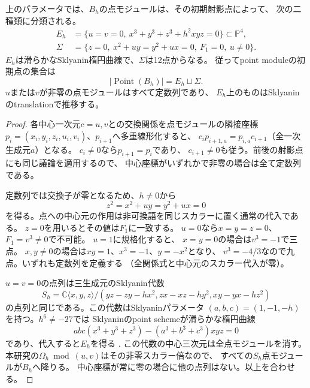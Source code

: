 \begin{proposition}\label{prop:psp-point-support}
上のパラメータでは、$B_h$の点モジュールは、その初期射影点によって、
次の二種類に分類される。
\[
\begin{split}
E_h&=\{u=v=0,\ x^3+y^3+z^3+h^2xyz=0\}
             \subset\mathbb P^4,\\
\Sigma&=\{z=0,\ x^2+uy=y^2+ux=0,\ F_1=0,\ u\ne0\}.
\end{split}
\]
$E_h$は滑らかなSklyanin楕円曲線で、$\Sigma$は12点からなる。
従ってpoint moduleの初期点の集合は
\[
|\operatorname{Point}(B_h)|=E_h\sqcup\Sigma.
\tag{PSP1}\label{eq:psp-support}
\]
$u$または$v$が非零の点モジュールはすべて定数列であり、
$E_h$上のものはSklyaninのtranslationで推移する。
\end{proposition}
\begin{proof}
各中心一次元$c=u,v$との交換関係を点モジュールの隣接座標
$p_i=(x_i,y_i,z_i,u_i,v_i)$、$p_{i+1}$へ多重線形化すると、
$c_ip_{i+1,a}=p_{i,a}c_{i+1}$（全一次生成元$a$）となる。
$c_i\ne0$なら$p_{i+1}=p_i$であり、
$c_{i+1}\ne0$も従う。前後の射影点にも同じ議論を適用するので、
中心座標がいずれかで非零の場合は全て定数列である。

定数列では交換子が零となるため、$h\ne0$から
\[
z^2=x^2+uy=y^2+ux=0
\]
を得る。点への中心元の作用は非可換語を同じスカラーに置く通常の代入である。
$z=0$を用いるとその値は$F_1$に一致する。
$u=0$なら$x=y=z=0$、$F_1=v^3\ne0$で不可能。
$u=1$に規格化すると、
$x=y=0$の場合は$v^3=-1$で三点。
$x,y\ne0$の場合は$xy=1$、$x^3=-1$、$y=-x^2$となり、
$v^3=-4/3$なので九点。いずれも定数列を定義する
（全関係式と中心元のスカラー代入が零）。

$u=v=0$の点列は三生成元のSklyanin代数
\[
S_h=\mathbb C\langle x,y,z\rangle/
(yz-zy-hx^2,zx-xz-hy^2,xy-yx-hz^2)
\]
の点列と同じである。この代数はSklyaninパラメータ
$(a,b,c)=(1,-1,-h)$を持つ。$h^6\ne-27$では
Sklyaninのpoint schemeが滑らかな楕円曲線
\[
abc(x^3+y^3+z^3)-(a^3+b^3+c^3)xyz=0
\]
であり、代入すると$E_h$を得る
\cite{PSPSmithTate,PSPDeLaet}.
この代数の中心三次元は全点モジュールを消す。
本研究の$\Omega_h\bmod(u,v)$はその非零スカラー倍なので、
すべての$S_h$点モジュールが$B_h$へ降りる。
中心座標が常に零の場合に他の点列はない。以上を合わせる。
\end{proof}

